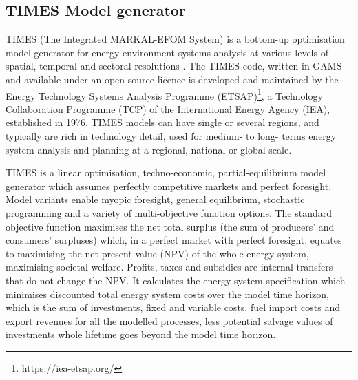 \documentclass[gmd,manuscript]{copernicus}
\begin{document}
\subsection{TIMES Model generator}
\label{ss:times_code}
TIMES (The Integrated MARKAL-EFOM System) is a bottom-up optimisation model generator for energy-environment systems analysis at various levels of spatial, temporal and sectoral resolutions \citep{Loulou2016a,Loulou2016}. The TIMES code, written in GAMS and available under an open source licence \citep{IEA-ETSAP2020a} is developed and maintained by the Energy Technology Systems Analysis Programme (ETSAP)\footnote{https://iea-etsap.org/}, a Technology Collaboration Programme (TCP) of the International Energy Agency (IEA), established in 1976. TIMES models can have single or several regions, and typically are rich in technology detail, used for medium- to long- terms energy system analysis and planning at a regional, national or global scale. 

TIMES is a linear optimisation, techno-economic, partial-equilibrium model generator which assumes perfectly competitive markets and perfect foresight. Model variants enable myopic foresight, general equilibrium, stochastic programming and a variety of multi-objective function options. The standard objective function maximises the net total surplus (the sum of producers’ and consumers’ surpluses) which, in a perfect market with perfect foresight, equates to maximising the net present value (NPV) of the whole energy system, maximising societal welfare. Profits, taxes and subsidies are internal transfers that do not change the NPV. It calculates the energy system specification which minimises discounted total energy system costs over the model time horizon, which is the sum of investments, fixed and variable costs, fuel import costs and export revenues for all the modelled processes, less potential salvage values of investments whole lifetime goes beyond the model time horizon. 
\end{document}
